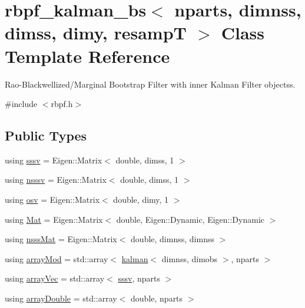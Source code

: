 \hypertarget{classrbpf__kalman__bs}{}\section{rbpf\+\_\+kalman\+\_\+bs$<$ nparts, dimnss, dimss, dimy, resampT $>$ Class Template Reference}
\label{classrbpf__kalman__bs}


Rao-\/\+Blackwellized/\+Marginal Bootstrap Filter with inner Kalman Filter objectss.  




{\ttfamily \#include $<$rbpf.\+h$>$}

\subsection*{Public Types}
\begin{DoxyCompactItemize}
\item 
using \hyperlink{classrbpf__kalman__bs_a803b67ae284377c11e727bb47601045a}{sssv} = Eigen\+::\+Matrix$<$ double, dimss, 1 $>$
\item 
using \hyperlink{classrbpf__kalman__bs_a8ce938ee1e02c5766ad15c1aca4e7796}{nsssv} = Eigen\+::\+Matrix$<$ double, dimss, 1 $>$
\item 
using \hyperlink{classrbpf__kalman__bs_a87690d6ffb54ffb4b76dc2de7fd415d5}{osv} = Eigen\+::\+Matrix$<$ double, dimy, 1 $>$
\item 
using \hyperlink{classrbpf__kalman__bs_a070b7a6225d1eae7595454fb523fd182}{Mat} = Eigen\+::\+Matrix$<$ double, Eigen\+::\+Dynamic, Eigen\+::\+Dynamic $>$
\item 
using \hyperlink{classrbpf__kalman__bs_ad20086b480fa12e9179a573c4b47818f}{nsss\+Mat} = Eigen\+::\+Matrix$<$ double, dimnss, dimnss $>$
\item 
using \hyperlink{classrbpf__kalman__bs_aa7f8e240e96a4272142f3d60fbd0d007}{array\+Mod} = std\+::array$<$ \hyperlink{classkalman}{kalman}$<$ dimnss, dimobs $>$, nparts $>$
\item 
using \hyperlink{classrbpf__kalman__bs_aad6c02f9c5db3937db418d3fc80deb4d}{array\+Vec} = std\+::array$<$ \hyperlink{classrbpf__kalman__bs_a803b67ae284377c11e727bb47601045a}{sssv}, nparts $>$
\item 
using \hyperlink{classrbpf__kalman__bs_a4f03888e8fc3a8c9402bde23823561de}{array\+Double} = std\+::array$<$ double, nparts $>$
\end{DoxyCompactItemize}
